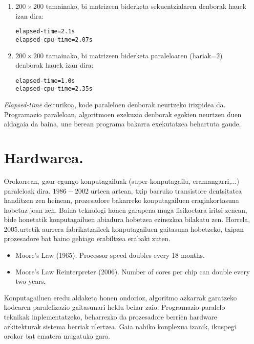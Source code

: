 \begin{enumerate}
\item $200 \times 200$ tamainako, bi matrizeen biderketa sekuentzialaren denborak hauek izan dira:
\begin{lstlisting}
elapsed-time=2.1s
elapsed-cpu-time=2.07s
\end{lstlisting}

\item $200 \times 200$ tamainako, bi matrizeen biderketa paraleloaren (hariak=$2$) denborak hauek izan dira:
\begin{lstlisting}
elapsed-time=1.0s
elapsed-cpu-time=2.35s
\end{lstlisting}
 
 
\end{enumerate}
 
\emph{Elapsed-time} deiturikoa, kode paraleloen denborak neurtzeko irizpidea da. Programazio paraleloan, algoritmoen exekuzio denborak egokien neurtzen duen aldagaia da baina, une berean programa bakarra exekutatzea behartuta gaude.       


\section{Hardwarea.}


Orokorrean, gaur-egungo konputagailuak (super-konputagailu, eramangarri,...) paraleloak dira. $1986-2002$ urteen artean, txip barruko transistore dentsitatea handitzen zen heinean, prozesadore bakarreko konputagailuen eraginkortasuna hobetuz joan zen. Baina teknologi honen garapena muga fisikoetara iritsi zenean, bide honetatik konputagailuen abiadura hobetzea ezinezkoa bilakatu zen. Horrela, 2005.urtetik aurrera fabrikatzaileek konputagailuen gaitasuna hobetzeko, txipan prozesadore bat baino gehiago erabiltzea erabaki zuten.  

\begin{itemize}
\item Moore's Law (1965). Processor speed doubles every 18 months.
\item Moore's Law Reinterpreter (2006). Number of cores per chip can double every two years.
\end{itemize}    

Konputagailuen eredu aldaketa honen ondorioz, algoritmo azkarrak garatzeko kodearen paralelizazio gaitasunari heldu behar zaio. Programazio paralelo teknikak inplementatzeko, beharrezko da prozesadore berrien hardware arkitekturak sistema berriak ulertzea. Gaia nahiko konplexua izanik, ikuspegi orokor bat ematera mugatuko gara.

